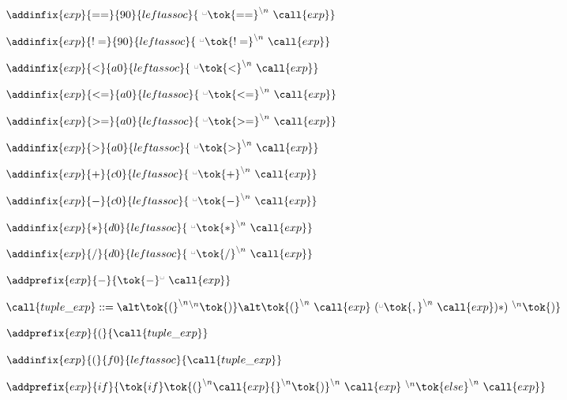   \item $\addinfix{exp}{==}{90}{leftassoc}{
  \ {{}^{\textrm{\textvisiblespace}}}\tok{==}^{\backslash{}n}\  \call{exp}}$
  \item $\addinfix{exp}{!=}{90}{leftassoc}{
  \ {{}^{\textrm{\textvisiblespace}}}\tok{!=}^{\backslash{}n}\  \call{exp}}$
  \item $\addinfix{exp}{<}{a0}{leftassoc}{
  \ {{}^{\textrm{\textvisiblespace}}}\tok{<}^{\backslash{}n}\  \call{exp}}$
  \item $\addinfix{exp}{<=}{a0}{leftassoc}{
  \ {{}^{\textrm{\textvisiblespace}}}\tok{<=}^{\backslash{}n}\  \call{exp}}$
  \item $\addinfix{exp}{>=}{a0}{leftassoc}{
  \ {{}^{\textrm{\textvisiblespace}}}\tok{>=}^{\backslash{}n}\  \call{exp}}$
  \item $\addinfix{exp}{>}{a0}{leftassoc}{
  \ {{}^{\textrm{\textvisiblespace}}}\tok{>}^{\backslash{}n}\  \call{exp}}$
  \item $\addinfix{exp}{+}{c0}{leftassoc}{
  \ {{}^{\textrm{\textvisiblespace}}}\tok{+}^{\backslash{}n}\  \call{exp}}$
  \item $\addinfix{exp}{-}{c0}{leftassoc}{
  \ {{}^{\textrm{\textvisiblespace}}}\tok{-}^{\backslash{}n}\  \call{exp}}$
  \item $\addinfix{exp}{*}{d0}{leftassoc}{
  \ {{}^{\textrm{\textvisiblespace}}}\tok{*}^{\backslash{}n}\  \call{exp}}$
  \item $\addinfix{exp}{/}{d0}{leftassoc}{
  \ {{}^{\textrm{\textvisiblespace}}}\tok{/}^{\backslash{}n}\  \call{exp}}$
   
 
   \item $\addprefix{exp}{-}{\tok{-}^\textrm\textvisiblespace\ \call{exp}}$
    
 
   \item $\call{tuple\_exp} ::=\\
   \alt \tok{(}^{\backslash{}n}{}^{\backslash{}n}\tok{)}\\
   \alt \tok{(}^{\backslash{}n}\ \call{exp}\ ({}^\textrm\textvisiblespace\tok{,}^{\backslash{}n}\ \call{exp})* )\ {}^{\backslash{}n}\tok{)}$
   \item $\addprefix{exp}{(}{\call{tuple\_exp}}$
   \item $\addinfix{exp}{(}{f0}{leftassoc}{\call{tuple\_exp}}$
   
 
   \item $\addprefix{exp}{if}{\tok{if} \tok{(}^{\backslash{}n} \call{exp} {}^{\backslash{}n}\tok{)}^{\backslash{}n}
   \ \call{exp}\ {}^{\backslash{}n}\tok{else}^{\backslash{}n}\ \call{exp}}$
   
